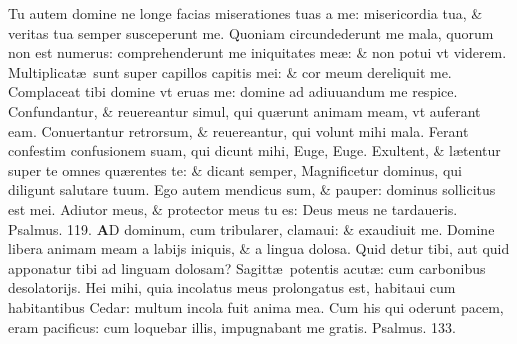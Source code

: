 \documentclass[a5paper,10pt]{book}
\def\ae{æ}
\begin{document}
\begin{multicols*}{2}
\newline \color{red} T\color{black}u autem domine ne longe facias miserationes tuas a me: misericordia tua, \& veritas tua semper susceperunt me.
\newline \color{red} Q\color{black}uoniam circundederunt me mala, quorum non est numerus: comprehenderunt me iniquitates me\ae : \& non potui vt viderem.
\newline \color{red} M\color{black}ultiplicat\ae \ sunt super capillos capitis mei: \& cor meum dereliquit me.
\newline \color{red} C\color{black}omplaceat tibi domine vt eruas me: domine ad adiuuandum me respice.
\newline \color{red} C\color{black}onfundantur, \& reuereantur simul, qui qu\ae runt animam meam, vt auferant eam.
\newline \color{red} C\color{black}onuertantur retrorsum, \& reuereantur, qui volunt mihi mala.
\newline \color{red} F\color{black}erant confestim confusionem suam, qui dicunt mihi, Euge, Euge.
\newline \color{red} E\color{black}xultent, \& l\ae tentur super te omnes qu\ae rentes te: \& dicant semper, Magnificetur dominus, qui diligunt salutare tuum.
\newline \color{red} E\color{black}go autem mendicus sum, \& pauper: dominus sollicitus est mei.
\newline \color{red} A\color{black}diutor meus, \& protector meus tu es: Deus meus ne tardaueris.
\newline \color{red} Psalmus. \hypertarget{ps119}{119.} \color{black}
\vspace{-.5em}
\lettrine[lines=2]{\bfseries \color{red} A}{}D dominum, cum tribularer, clamaui: \& exaudiuit me.
\newline \color{red} D\color{black}omine libera animam meam a labijs iniquis, \& a lingua dolosa.
\newline \color{red} Q\color{black}uid detur tibi, aut quid apponatur tibi ad linguam dolosam?
\newline \color{red} S\color{black}agitt\ae \ potentis acut\ae : cum carbonibus desolatorijs.
\newline \color{red} H\color{black}ei mihi, quia incolatus meus prolongatus est, habitaui cum habitantibus Cedar: multum incola fuit anima mea.%
\newline \color{red} C\color{black}um his qui oderunt pacem, eram pacificus: cum loquebar illis, impugnabant me gratis. \quad \color{red} Psalmus. \hypertarget{ps133}{133.} \color{black}

\end{multicols*}
\end{document}
